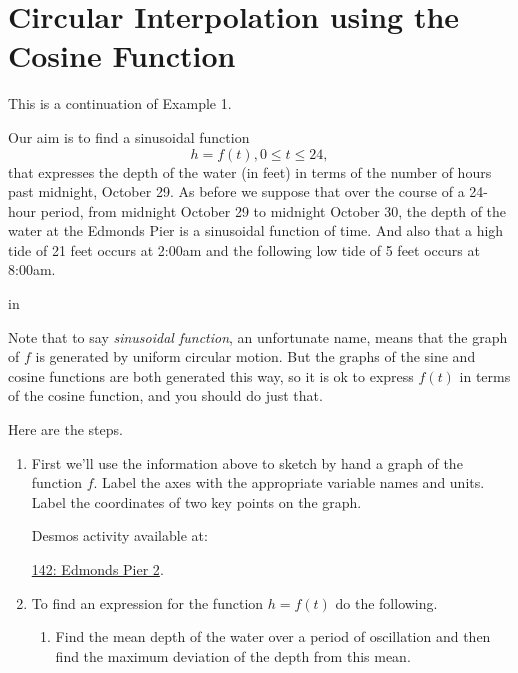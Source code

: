 \documentclass{ximera}
\newcommand{\pskip}{\vskip 0.1 in}
\begin{document}
\section{Circular Interpolation using the Cosine Function}

\begin{example} \label{EODGrgrgrFDSFSD}


This is a continuation of Example 1.

Our aim is to find a sinusoidal function
\[
    h = f(t) , 0\leq t \leq 24, 
\]
that expresses the depth of the water (in feet) in terms of the number of hours past midnight, October 29. As before we suppose that over the course of a 24-hour period, from midnight October 29 to midnight October 30, the depth of the water at the Edmonds Pier is a sinusoidal function of time. And also that a high tide of 21 feet occurs at 2:00am and the following low tide of 5 feet occurs at 8:00am. 

\pskip

Note that to say \emph{sinusoidal function}, an unfortunate name, means that the graph of $f$ is generated by uniform circular motion. But the graphs of the sine and cosine functions are both generated this way, so it is ok to express $f(t)$ in terms of the cosine function, and you should do just that.

\begin{explanation}
Here are the steps.

\begin{enumerate}

\item  First we'll use the information above to sketch by hand a graph of the function $f$. Label the axes with the appropriate variable names and units. Label the coordinates of two key points on the graph.

Desmos activity available at:

\href{https://www.desmos.com/calculator/cxybepr3od}{142: Edmonds Pier 2}.

 
\begin{onlineOnly}
    \begin{center}
\end{center}
\end{onlineOnly}

\item To find an expression for the function $h=f(t)$ do the following.

\begin{enumerate}
\item Find the mean depth of the water over a period of oscillation and then find the maximum deviation of the depth from this mean.


\end{enumerate}
\end{enumerate}
\end{explanation}
\end{example}
\end{document}
